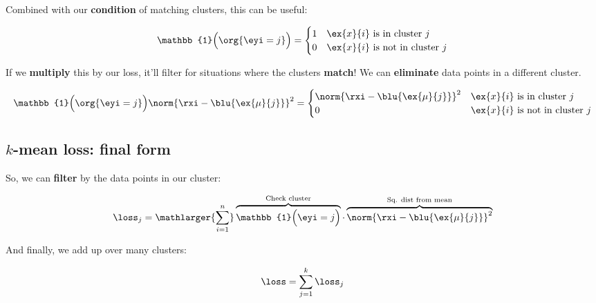         Combined with our \textbf{condition} of matching clusters, this can be useful:
        
        \begin{equation}
            \mathbb{1} \Big( \org{\eyi = j} \Big) = 
            \begin{cases}
                1 & \ex{x}{i} \text{ is in cluster } j \\
                0 & \ex{x}{i} \text{ is not in cluster } j \\
            \end{cases}
        \end{equation}
        
        If we \textbf{multiply} this by our loss, it'll filter for situations where the clusters \textbf{match}! We can \textbf{eliminate} data points in a different cluster.

        \begin{equation}
            \mathbb{1} \Big( \org{\eyi = j} \Big) \norm{ \rxi - \blu{\ex{\mu}{j}} }^2 = 
            \begin{cases}
                \norm{ \rxi - \blu{\ex{\mu}{j}} }^2 & \ex{x}{i} \text{ is in cluster } j \\
                0 & \ex{x}{i} \text{ is not in cluster } j \\
            \end{cases}
        \end{equation}
        
    \subsection{$k$-mean loss: final form}
    
        So, we can \textbf{filter} by the data points in our cluster:
        
        \begin{equation}
            \loss_j =
            \mathlarger{\sum_{i=1}^n} 
                \overbrace{
                    \mathbb{1} \Big( \eyi = j \Big)
                }^{ \text{Check cluster}}
                \cdot
                \overbrace{
                    \norm{ \rxi - \blu{\ex{\mu}{j}} }^2 
                }^{\text{Sq. dist from mean} }
        \end{equation}
        
        And finally, we add up over many clusters:
        
        \begin{equation}
            \loss = \sum_{j=1}^k \loss_j
        \end{equation}
        
